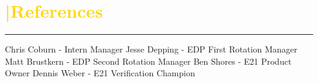 \section{\textcolor{gold}{\faComment|References}}
\noindent\color{blue}\rule{12.5cm}{0.4pt}
Chris Coburn - Intern Manager 
Jesse Depping - EDP First Rotation Manager
Matt Brustkern - EDP Second Rotation Manager 
Ben Shores - E21 Product Owner
Dennis Weber - E21 Verification Champion

